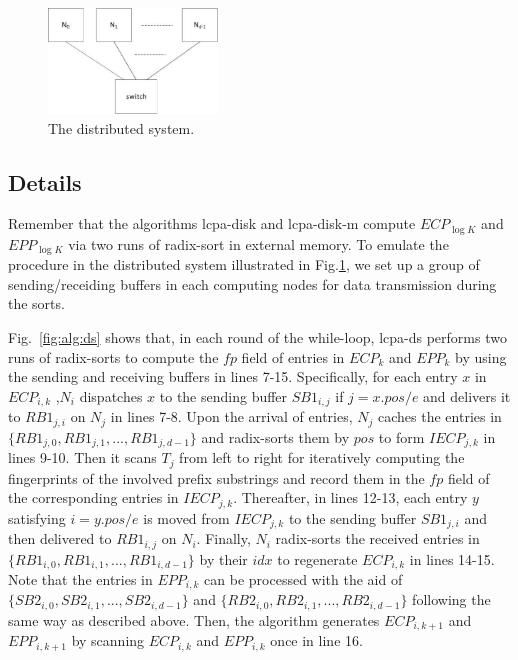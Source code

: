 \documentclass[10pt,journal,compsoc]{IEEEtran}
\begin{document}
\begin{CJK*}{GBK}{song}
\begin{figure}[hbtp!]
  \centering
  \includegraphics[width=0.4\textwidth]{distributed_system.eps}
  \caption{The distributed system. }
  \label{fig:distributed_system}
\end{figure}


\subsection{Details}

Remember that the algorithms lcpa-disk and lcpa-disk-m compute $ECP_{\log K}$ and $EPP_{\log K}$ via two runs of radix-sort in external memory. To emulate the procedure in the distributed system illustrated in Fig.\ref{fig:distributed_system}, we set up a group of sending/receiding buffers in each computing nodes for data transmission during the sorts.

Fig.~\ref{fig:alg:ds} shows that, in each round of the while-loop, lcpa-ds  performs two runs of radix-sorts to compute the $fp$ field of entries in $ECP_k$ and $EPP_k$ by using the sending and receiving buffers in lines 7-15. Specifically, for each entry $x$ in $ECP_{i,k}$ ,$N_i$ dispatches $x$ to the sending buffer $SB1_{i,j}$ if $j = x.pos / e$ and delivers it to $RB1_{j,i}$ on $N_j$ in lines 7-8. Upon the arrival of entries, $N_j$ caches the entries in $\{RB1_{j,0},RB1_{j,1},...,RB1_{j,d-1}\}$ and radix-sorts them by $pos$ to form $IECP_{j,k}$ in lines 9-10. Then it scans $T_j$ from left to right for iteratively computing the fingerprints of the involved prefix substrings and record them in the $fp$ field of the corresponding entries in $IECP_{j,k}$. Thereafter, in lines 12-13, each entry $y$ satisfying $i = y.pos /e$ is moved from $IECP_{j,k}$ to the sending buffer $SB1_{j,i}$ and then delivered to $RB1_{i,j}$ on $N_i$. Finally, $N_i$ radix-sorts the received entries in $\{RB1_{i,0},RB1_{i,1},...,RB1_{i,d-1}\}$ by their $idx$ to regenerate $ECP_{i,k}$ in lines 14-15. Note that the entries in $EPP_{i,k}$ can be processed with the aid of $\{SB2_{i,0}, SB2_{i,1},...,SB2_{i,d-1}\}$ and $\{RB2_{i,0}, RB2_{i,1}, ...,RB2_{i,d-1}\}$ following the same way as described above. Then, the algorithm generates $ECP_{i,k+1}$ and $EPP_{i,k+1}$ by scanning $ECP_{i,k}$ and $EPP_{i,k}$ once in line 16.


\end{CJK*}
\end{document}
